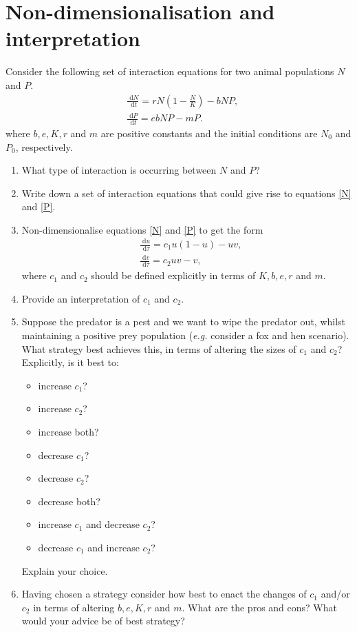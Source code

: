 \documentclass[10pt]{article}
\newcommand{\rd}{\text{ d}}
\newcommand{\eqns}[2]{equations \eqref{#1} and \eqref{#2}}
\newcommand{\eg}{\emph{e.g.} }
\renewcommand{\l}{\left(}
\renewcommand{\r}{\right)}
\begin{document}
\section{Non-dimensionalisation and interpretation}
Consider the following set of interaction equations for two animal populations $N$ and $P$.
\begin{align}
&\frac{\rd N}{\rd t} =rN\l 1- \frac{N}{K}\r-bNP,\label{N}\\
&\frac{\rd P}{\rd t} =ebNP-mP.\label{P}
\end{align}
where $b, e, K, r$ and $m$ are positive constants and the initial conditions are $N_0$ and $P_0$, respectively.
\begin{enumerate}
\item What type of interaction is occurring between $N$ and $P$?
\item Write down a set of interaction equations that could give rise to \eqns{N}{P}.
\item Non-dimensionalise \eqns{N}{P} to get the form
\begin{align}
&\frac{\rd u}{\rd \tau} =c_1u\l 1- u\r-uv,\label{u}\\
&\frac{\rd v}{\rd \tau} =c_2uv-v,\label{v}
\end{align}
where $c_1$ and $c_2$ should be defined explicitly in terms of $K, b, e, r$ and $m$.
\item Provide an interpretation of $c_1$ and $c_2$.
\item Suppose the predator is a pest and we want to wipe the predator out, whilst maintaining a positive prey population (\eg consider a fox and hen scenario). What strategy best achieves this, in terms of altering the sizes of $c_1$ and $c_2$? Explicitly, is it best to:
\begin{itemize}
\item increase $c_1$?
\item increase $c_2$?
\item increase both?
\item decrease $c_1$?
\item decrease $c_2$?
\item decrease both?
\item increase $c_1$ and decrease $c_2$?
\item decrease $c_1$ and increase $c_2$?
\end{itemize} 
Explain your choice.
\item Having chosen a strategy consider how best to enact the changes of $c_1$ and/or $c_2$ in terms of altering $b, e, K, r$ and $m$. What are the pros and cons? What would your advice be of best strategy?
\end{enumerate}
\end{document}
